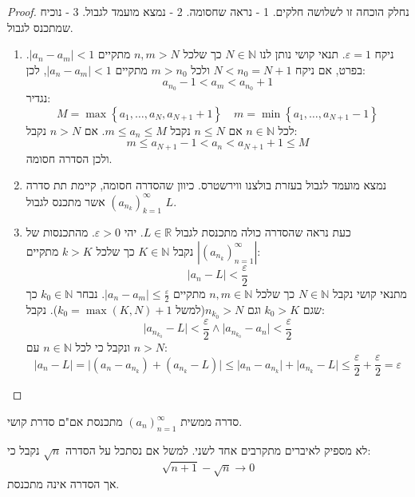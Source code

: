 \documentclass{tstextbook}
\begin{document}
\begin{proof}
נחלק הוכחה זו לשלושה חלקים. 1 - נראה שחסומה. 2 - נמצא מועמד לגבול. 3 - נוכיח שמתכנס לגבול.

  \begin{enumerate}
    \item ניקח \(\varepsilon = 1\). תנאי קושי נותן לנו \(N \in \mathbb{N}\) כך שלכל \(n,m> N\) מתקיים \(\lvert a_{n}-a_{m} \rvert< 1\). בפרט, אם ניקח \(N<n_{0}=N+1\) ולכל \(m>n_{0}\) מתקיים \(\lvert a_{n}-a_{m} \rvert<1\), לכן: 
$$a_{n_{0}}-1<a_{m}<a_{n_{0}}+1$$
נגדיר:
$$M=\max \left\{  a_{1},\dots,a_{N},a_{N+1}+1  \right\}\quad m=\min \left\{  a_{1},\dots,a_{N+1}-1  \right\}$$
לכל \(n \in \mathbb{N}\) אם \(n\leq N\) נקבל \(m\leq a_{n}\leq M\). אם \(n>N\) נקבל:
$$m\leq a_{N+1}-1<a_{n}<a_{N+1}+1\leq M$$
ולכן הסדרה חסומה.


    \item נמצא מועמד לגבול בעזרת בולצנו ווירשטרס. כיוון שהסדרה חסומה, קיימת תת סדרה \((a_{n_{k}})_{k=1}^\infty\) אשר מתכנס לגבול \(L\). 


    \item כעת נראה שהסדרה כולה מתכנסת לגבול \(L \in \mathbb{R}\). יהי \(\varepsilon > 0\). מהתכנסות של \(\left\lvert  (a_{n_{k}})_{n=1}^\infty  \right\rvert\) נקבל \(K \in \mathbb{N}\) כך שלכל \(k>K\) מתקיים: 
$$\lvert a_{n}-L \rvert <\frac{\varepsilon}{2}$$
מתנאי קושי נקבל \(N \in \mathbb{N}\) כך שלכל \(n,m \in \mathbb{N}\) מתקיים \(\lvert a_{n}- a_{m} \rvert\leq \frac{\varepsilon}{2}\). נבחר \(k_{0} \in \mathbb{N}\) כך שגם \(k_{0}>K\) וגם \(n_{k_{0}}>N\)(למשל \(k_{0}=\max(K,N)+1\)). נקבל:
$$\lvert a_{n_{k_{0}}}-L \rvert <\frac{\varepsilon}{2} \land \lvert a_{n_{k_{0}}}-a_{n} \rvert <\frac{\varepsilon}{2}$$
ונקבל כי לכל \(n \in \mathbb{N}\) עם \(n>N\):
$$\lvert a_{n}-L \rvert =\lvert (a_{n}-a_{n_{k}})+(a_{n_{k}}-L) \rvert \leq \lvert a_{n}-a_{n_{k}} \rvert +\lvert a_{n_{k}}-L \rvert \leq \frac{\varepsilon}{2}+\frac{\varepsilon}{2}=\varepsilon$$


  \end{enumerate}
\end{proof}
\begin{corollary}
סדרה ממשית \((a_n)_{n=1}^\infty\) מתכנסת אם"ם סדרת קושי.

\end{corollary}
\begin{remark}
לא מספיק לאיברים מתקרבים אחד לשני. למשל אם נסתכל על הסדרה \(\sqrt{ n }\) נקבל כי:
$$\sqrt{ n+1 }-\sqrt{ n }\to 0$$
אך הסדרה אינה מתכנסת.

\end{remark}
\end{document}
